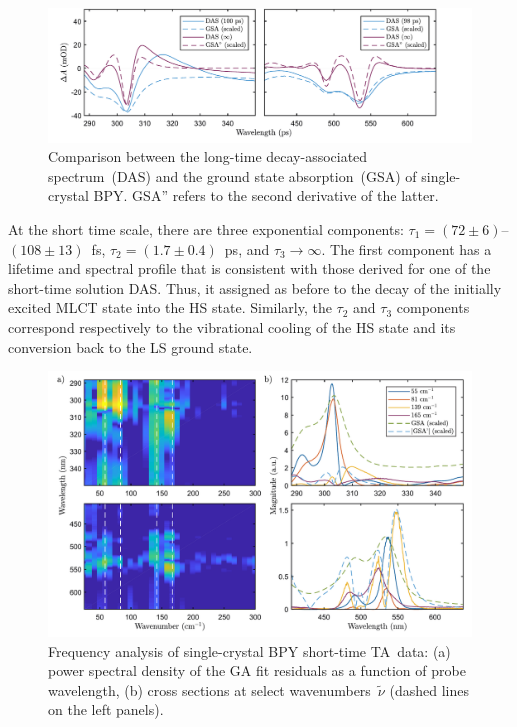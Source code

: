\begin{figure}[t!]
  \centering
  \includegraphics[width = \textwidth]{Figures/fig_BPY_data_crystal_DAS_GSA.pdf}
  \caption[Comparison between the long-time DAS and the GSA of single-crystal BPY.]{
    Comparison between the long-time decay-associated spectrum~(DAS) and
    the ground state absorption~(GSA) of single-crystal BPY.
    GSA'' refers to the second derivative of the latter.
  }
  \label{fig: BPY-data-crystal-DAS-GSA}
\end{figure}

At the short time scale, there are three exponential components:
$\tau_1 = (72 \pm 6)$--$(108 \pm 13)$~fs, $\tau_2 = (1.7 \pm 0.4)$~ps,
and $\tau_3 \rightarrow \infty$.
%
The first component has a lifetime and spectral profile that is consistent
with those derived for one of the short-time solution DAS.
Thus, it assigned as before to the decay of the initially excited MLCT state into the HS state.
%
Similarly, the $\tau_2$ and $\tau_3$ components correspond respectively
to the vibrational cooling of the HS state and its conversion back to the LS ground state.

\begin{figure}[ht!]
  \centering
  \includegraphics[width = \textwidth]{Figures/fig_BPY_data_crystal_Welch.pdf}
  \caption[Frequency analysis of single-crystal BPY short-time TA~data.]{
    Frequency analysis of single-crystal BPY short-time TA~data:
    (a) power spectral density of the GA fit residuals as a function of probe wavelength,
    (b) cross sections at select wavenumbers~$\tilde{\nu}$
    (dashed lines on the left panels).
  }
  \label{fig: BPY-data-crystal-Welch}
\end{figure}

